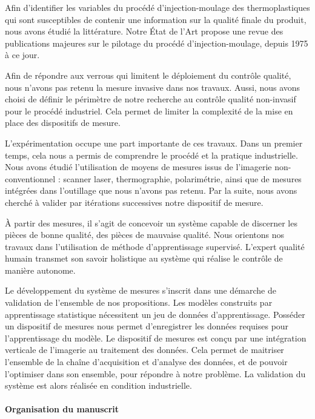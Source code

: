 Afin d'identifier les variables du procédé d'injection-moulage des thermoplastiques qui sont susceptibles de contenir une information sur la qualité finale du produit, nous avons étudié la littérature.
Notre État de l'Art propose une revue des publications majeures sur le pilotage du procédé d'injection-moulage, depuis 1975 à ce jour.

Afin de répondre aux verrous qui limitent le déploiement du contrôle qualité, nous n'avons pas retenu la mesure invasive dans nos travaux.
Aussi, nous avons choisi de définir le périmètre de notre recherche au contrôle qualité non-invasif pour le procédé industriel.
Cela permet de limiter la complexité de la mise en place des dispositifs de mesure.

L'expérimentation occupe une part importante de ces travaux.
Dans un premier temps, cela nous a permis de comprendre le procédé et la pratique industrielle.
Nous avons étudié l'utilisation de moyens de mesures issus de l'imagerie non-conventionnel : scanner laser, thermographie, polarimétrie, ainsi que de mesures intégrées dans l'outillage que nous n'avons pas retenu.
Par la suite, nous avons cherché à valider par itérations successives notre dispositif de mesure.

À partir des mesures, il s'agit de concevoir un système capable de discerner les pièces de bonne qualité, des pièces de mauvaise qualité.
Nous orientons nos travaux dans l'utilisation de méthode d'apprentissage supervisé.
L'expert qualité humain transmet son savoir holistique au système qui réalise le contrôle de manière autonome.

Le développement du système de mesures s'inscrit dans une démarche de validation de l'ensemble de nos propositions.
Les modèles construits par apprentissage statistique nécessitent un jeu de données d'apprentissage.
Posséder un dispositif de mesures nous permet d'enregistrer les données requises pour l'apprentissage du modèle.
Le dispositif de mesures est conçu par une intégration verticale de l'imagerie au traitement des données.
Cela permet de maitriser l'ensemble de la chaîne d'acquisition et d'analyse des données, et de pouvoir l'optimiser dans son ensemble, pour répondre à notre problème.
La validation du système est alors réalisée en condition industrielle.


\bigskip
\paragraph{Organisation du manuscrit}\mbox{} \\

